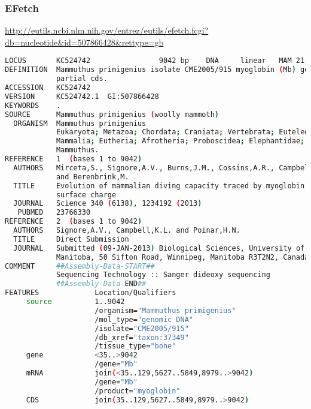 \documentclass{beamer}
\begin{document}
\begin{frame}[fragile]
\frametitle{EFetch}
\url{http://eutils.ncbi.nlm.nih.gov/entrez/eutils/efetch.fcgi?db=nucleotide&id=507866428&rettype=gb}
\begin{lstlisting}[language=bash,basicstyle=\tiny,breaklines=false]
LOCUS       KC524742                9042 bp    DNA     linear   MAM 21-JUN-2013
DEFINITION  Mammuthus primigenius isolate CME2005/915 myoglobin (Mb) gene,
            partial cds.
ACCESSION   KC524742
VERSION     KC524742.1  GI:507866428
KEYWORDS    .
SOURCE      Mammuthus primigenius (woolly mammoth)
  ORGANISM  Mammuthus primigenius
            Eukaryota; Metazoa; Chordata; Craniata; Vertebrata; Euteleostomi;
            Mammalia; Eutheria; Afrotheria; Proboscidea; Elephantidae;
            Mammuthus.
REFERENCE   1  (bases 1 to 9042)
  AUTHORS   Mirceta,S., Signore,A.V., Burns,J.M., Cossins,A.R., Campbell,K.L.
            and Berenbrink,M.
  TITLE     Evolution of mammalian diving capacity traced by myoglobin net
            surface charge
  JOURNAL   Science 340 (6138), 1234192 (2013)
   PUBMED   23766330
REFERENCE   2  (bases 1 to 9042)
  AUTHORS   Signore,A.V., Campbell,K.L. and Poinar,H.N.
  TITLE     Direct Submission
  JOURNAL   Submitted (09-JAN-2013) Biological Sciences, University of
            Manitoba, 50 Sifton Road, Winnipeg, Manitoba R3T2N2, Canada
COMMENT     ##Assembly-Data-START##
            Sequencing Technology :: Sanger dideoxy sequencing
            ##Assembly-Data-END##
FEATURES             Location/Qualifiers
     source          1..9042
                     /organism="Mammuthus primigenius"
                     /mol_type="genomic DNA"
                     /isolate="CME2005/915"
                     /db_xref="taxon:37349"
                     /tissue_type="bone"
     gene            <35..>9042
                     /gene="Mb"
     mRNA            join(<35..129,5627..5849,8979..>9042)
                     /gene="Mb"
                     /product="myoglobin"
     CDS             join(35..129,5627..5849,8979..>9042)

\end{lstlisting}
\end{frame}
\end{document}
